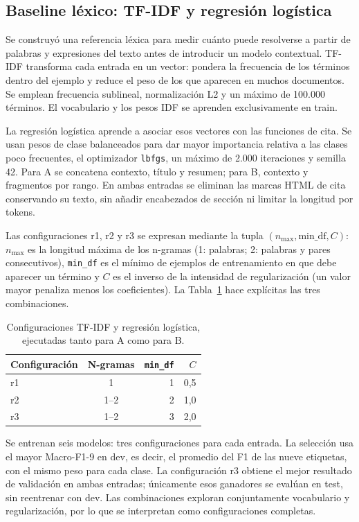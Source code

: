 \documentclass[10pt,a4paper,twocolumn]{article}
\begin{document}
\subsection{Baseline léxico: TF-IDF y regresión logística}
Se construyó una referencia léxica para medir cuánto puede resolverse a partir de palabras y expresiones del texto antes de introducir un modelo contextual. TF-IDF transforma cada entrada en un vector: pondera la frecuencia de los términos dentro del ejemplo y reduce el peso de los que aparecen en muchos documentos. Se emplean frecuencia sublineal, normalización L2 y un máximo de 100.000 términos. El vocabulario y los pesos IDF se aprenden exclusivamente en train.

La regresión logística aprende a asociar esos vectores con las funciones de cita. Se usan pesos de clase balanceados para dar mayor importancia relativa a las clases poco frecuentes, el optimizador \texttt{lbfgs}, un máximo de 2.000 iteraciones y semilla 42. Para A se concatena contexto, título y resumen; para B, contexto y fragmentos por rango. En ambas entradas se eliminan las marcas HTML de cita conservando su texto, sin añadir encabezados de sección ni limitar la longitud por tokens.

Las configuraciones r1, r2 y r3 se expresan mediante la tupla $(n_{\max},\mathrm{min\_df},C)$: $n_{\max}$ es la longitud máxima de los n-gramas (1: palabras; 2: palabras y pares consecutivos), \texttt{min\_df} es el mínimo de ejemplos de entrenamiento en que debe aparecer un término y $C$ es el inverso de la intensidad de regularización (un valor mayor penaliza menos los coeficientes). La Tabla~\ref{tab:tfconfig} hace explícitas las tres combinaciones.

\begin{table}[t]
\centering\small
\caption{Configuraciones TF-IDF y regresión logística, ejecutadas tanto para A como para B.}\label{tab:tfconfig}
\begin{tabular}{lcrr}\toprule
Configuración & N-gramas & \texttt{min\_df} & $C$\\\midrule
r1 & 1 & 1 & 0,5\\
r2 & 1--2 & 2 & 1,0\\
r3 & 1--2 & 3 & 2,0\\\bottomrule
\end{tabular}
\end{table}

Se entrenan seis modelos: tres configuraciones para cada entrada. La selección usa el mayor Macro-F1-9 en dev, es decir, el promedio del F1 de las nueve etiquetas, con el mismo peso para cada clase. La configuración r3 obtiene el mejor resultado de validación en ambas entradas; únicamente esos ganadores se evalúan en test, sin reentrenar con dev. Las combinaciones exploran conjuntamente vocabulario y regularización, por lo que se interpretan como configuraciones completas.
\end{document}
